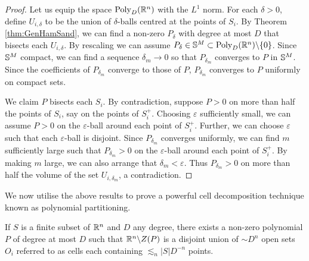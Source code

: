 \begin{proof}
    Let us equip the space $\operatorname{Poly}_D (\mathbb R^n)$ with the $L^1$ norm.
    For each $\delta>0$, define $U_{i, \delta}$ to be the union of $\delta$-balls centred at the points of $S_i$. 
    By Theorem \ref{thm:GenHamSand}, we can find a non-zero $P_{\delta}$ with degree at most $D$ that bisects each $U_{i, \delta}$. 
    By rescaling we can assume $P_{\delta} \in \mathbb S^M \subset \text{Poly}_D (\mathbb R^n) \backslash \{0\}$.
    Since $\mathbb S^M$ compact, we can find a sequence $\delta_m \to 0$ so that $P_{\delta_{m}}$ converges to $P$ in $\mathbb S^M$.
    Since the coefficients of $P_{\delta_{m}}$ converge to those of $P$, $P_{\delta_{m}}$ converges to $P$ uniformly on compact sets.

    We claim $P$ bisects each $S_i$. 
    By contradiction, suppose $P>0$ on more than half the points of $S_i$, say on the points of $S_i^+$. 
    Choosing $\varepsilon$ sufficiently small, we can assume $P>0$ on the $\varepsilon$-ball around each point of $S_i^+$.
    Further, we can choose $\varepsilon$ such that each $\varepsilon$-ball is disjoint. 
    Since $P_{\delta_{m}}$ converges uniformly, we can find $m$ sufficiently large such that $P_{\delta_{m}}>0$ 
    on the $\varepsilon$-ball around each point of $S_i^+$.
    By making $m$ large, we can also arrange that $\delta_m < \varepsilon$.
    Thus $P_{\delta_{m}} > 0$ on more than half the volume of the set $U_{i, \delta_{m}}$, a contradiction. 
\end{proof}
We now utilise the above results to prove a powerful cell decomposition technique known as polynomial partitioning.
\begin{theorem}
    If $S$ is a finite subset of $\mathbb R^n$ and $D$ any degree, there exists
    a non-zero polynomial $P$ of degree at most $D$ such that $\mathbb R^n \backslash Z(P)$ is a disjoint union of $\sim D^n$ open sets $O_i$ referred to as cells each containing
    $\lesssim_n |S|D^{-n}$ points. \label{thm:PolyPartioning}
 \end{theorem}
 
